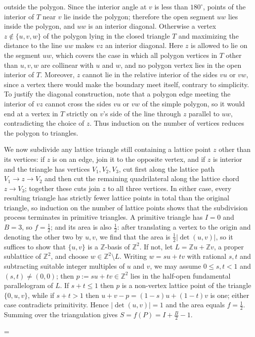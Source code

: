 \documentclass[11pt]{article}
\makeatletter
\theoremstyle{ntstyle}
\let\nt@closedisplay\]
\def\nt@guardedclose{\@ifnextchar\par{\nt@closeafterpar}{\@ifnextchar\end{\postdisplaypenalty\@M\nt@closedisplay}{\nt@closedisplay}}}
\def\nt@closeafterpar\par{\@ifnextchar\par{\nt@closeafterpar}{\@ifnextchar\end{\postdisplaypenalty\@M\nt@closedisplay\par}{\nt@closedisplay\par}}}
\renewenvironment{proof}[1][\proofname]{\par
  \pushQED{\qed}\normalfont\topsep\medskipamount\edef\nt@afterproof{\@endparpenalty=\the\@endparpenalty\relax}\@beginparpenalty\@M\@endparpenalty\@M\let\]\nt@guardedclose\trivlist\item[]\textit{#1\@addpunct{.}} \ignorespaces}{\ifvmode\addpenalty\@M\fi\popQED\nt@afterproof\endtrivlist\@endpefalse}
\makeatother
\begin{document}
\begin{proof}
	outside the polygon. Since the interior angle at $v$ is less than
	$180^{\circ}$, points of the interior of $T$ near $v$ lie inside the
	polygon; therefore the open segment $uw$ lies inside the polygon, and $uw$
	is an interior diagonal. Otherwise a vertex
	$z\notin\{u,v,w\}$ of the polygon lying in the closed triangle $T$ and
	maximizing the distance to the line $uw$ makes $vz$ an interior diagonal.
	Here $z$ is allowed to lie on the segment $uw$, which covers the case in
	which all polygon vertices in $T$ other than $u,v,w$ are collinear with
	$u$ and $w$, and no polygon vertex lies in the open interior of $T$. Moreover, $z$ cannot lie in the
	relative interior of the sides $vu$ or $vw$, since a vertex there would
	make the boundary meet itself, contrary to simplicity. To justify the diagonal construction, note that a polygon
	edge meeting the interior of $vz$ cannot cross the sides $vu$ or $vw$ of
	the simple polygon, so it would end at a vertex in $T$ strictly on $v$'s
	side of the line through $z$ parallel to $uw$, contradicting the choice of
	$z$. Thus induction on the number of vertices reduces the polygon to
	triangles.

	We now subdivide any lattice triangle still containing a lattice point
	$z$ other than its vertices: if $z$ is on an edge, join it to the opposite
	vertex, and if $z$ is interior and the triangle has vertices
	$V_1,V_2,V_3$, cut first along the lattice path
	$V_1 \to z \to V_2$ and then cut the remaining quadrilateral along the lattice
	chord $z \to V_3$; together these cuts join $z$ to all three vertices. In
	either case, every resulting triangle has strictly fewer lattice
	points in total than the original triangle, so induction on the number of lattice
	points shows that the subdivision process terminates in primitive
	triangles. A primitive triangle has $I = 0$ and $B = 3$, so $f =
		\tfrac{1}{2}$; and its area is also $\tfrac{1}{2}$: after translating a vertex to
	the origin and denoting the other two by $u,v$, we find that the area is
	$\tfrac{1}{2}|\det(u,v)|$, so it suffices to show that $\{u,v\}$ is a
	$\mathbb{Z}$-basis of $\mathbb{Z}^2$. If not, let
	$L=\mathbb{Z}u+\mathbb{Z}v$, a proper sublattice of $\mathbb{Z}^2$, and
	choose $w\in\mathbb{Z}^2\setminus L$. Writing $w=su+tv$ with rational
	$s,t$ and subtracting suitable integer multiples of $u$ and $v$, we
	may assume $0\le s,t<1$ and $(s,t)\neq(0,0)$; then
	$p:=su+tv\in\mathbb{Z}^2$ lies in the half-open fundamental
	parallelogram of $L$. If $s+t\le1$ then $p$ is a non-vertex lattice
	point of the triangle $\{0,u,v\}$, while if $s+t>1$ then
	$u+v-p=(1-s)u+(1-t)v$ is one; either case contradicts
	primitivity. Hence $|\det(u,v)|=1$ and the area equals $f=\tfrac{1}{2}$.
	Summing over the triangulation gives $S = f(P) = I + \tfrac{B}{2} -
		1$.

\end{proof}
\end{document}
